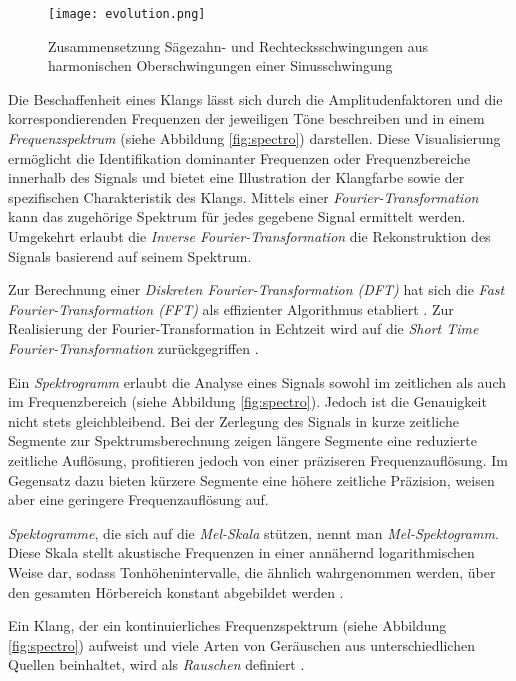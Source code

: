\documentclass[
  a4paper,  %
  twoside,  %
  bibliography=totoc,
  headsepline,
  cleardoublepage=empty,
  parskip=half,
  draft=false
]{scrbook}
\begin{document}
\begin{figure}
  \centering
  \texttt{[image: evolution.png]}
  \caption[Fourier Reihe]{Zusammensetzung Sägezahn- und Rechtecksschwingungen aus harmonischen Oberschwingungen einer Sinusschwingung}
  \label{fig:evolution}
\end{figure}

Die Beschaffenheit eines Klangs lässt sich durch die Amplitudenfaktoren und die korrespondierenden Frequenzen der jeweiligen Töne beschreiben und in einem \emph{Frequenzspektrum} (siehe Abbildung \ref{fig:spectro}) darstellen. Diese Visualisierung ermöglicht die Identifikation dominanter Frequenzen oder Frequenzbereiche innerhalb des Signals und bietet eine Illustration der Klangfarbe sowie der spezifischen Charakteristik des Klangs. Mittels einer \emph{Fourier-Transformation} kann das zugehörige Spektrum für jedes gegebene Signal ermittelt werden. Umgekehrt erlaubt die \emph{Inverse Fourier-Transformation} die Rekonstruktion des Signals basierend auf seinem Spektrum. \cite{raffaseder_audiodesign_2010}

Zur Berechnung einer \emph{Diskreten Fourier-Transformation (DFT)} hat sich die \emph{Fast Fourier-Transformation (FFT)} als effizienter Algorithmus etabliert \cite{heideman_gauss_1985}. Zur Realisierung der Fourier-Transformation in Echtzeit wird auf die \emph{Short Time Fourier-Transformation} zurückgegriffen \cite{thyagarajan_introduction_2019}. 

Ein \emph{Spektrogramm} erlaubt die Analyse eines Signals sowohl im zeitlichen als auch im Frequenzbereich (siehe Abbildung \ref{fig:spectro}). Jedoch ist die Genauigkeit nicht stets gleichbleibend. Bei der Zerlegung des Signals in kurze zeitliche Segmente zur Spektrumsberechnung zeigen längere Segmente eine reduzierte zeitliche Auflösung, profitieren jedoch von einer präziseren Frequenzauflösung. Im Gegensatz dazu bieten kürzere Segmente eine höhere zeitliche Präzision, weisen aber eine geringere Frequenzauflösung auf. \cite{raffaseder_audiodesign_2010}

\emph{Spektogramme}, die sich auf die \emph{Mel-Skala} stützen, nennt man \emph{Mel-Spektogramm}. Diese Skala stellt akustische Frequenzen in einer annähernd logarithmischen Weise dar, sodass Tonhöhenintervalle, die ähnlich wahrgenommen werden, über den gesamten Hörbereich konstant abgebildet werden \cite{noauthor_librosamel_frequencies_nodate}.

Ein Klang, der ein kontinuierliches Frequenzspektrum (siehe Abbildung \ref{fig:spectro}) aufweist und viele Arten von Geräuschen aus unterschiedlichen Quellen beinhaltet, wird als \emph{Rauschen} definiert \cite{tsuji_physics_2021}.
\end{document}
